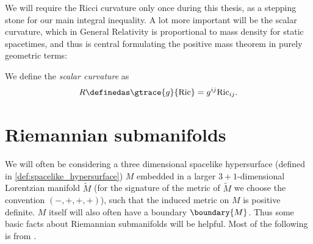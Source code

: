 \documentclass[titlepage,numbers=noenddot,headinclude,oneside,%
footinclude=true,cleardoublepage=empty,%
BCOR=5mm,paper=a4,fontsize=11pt,%
english,%
]{scrartcl}
\newcommand{\Ricci}{\mathrm{Ric}} %
\begin{document}
We will require the Ricci curvature only once during this thesis, as a stepping stone for our main integral inequality. A lot more important will be the scalar curvature, which in General Relativity is proportional to mass density for static spacetimes, and thus is central formulating the positive mass theorem in purely geometric terms:
\begin{definition}
    We define the \emph{scalar curvature} as
    \begin{equation*}
        R\definedas \gtrace{g}{\Ricci}=g^{ij}\Ricci_{ij}.
    \end{equation*}
\end{definition}

\section{Riemannian submanifolds}\label{sec:riemannian_submanifolds}

We will often be considering a three dimensional spacelike hypersurface (defined in \cref{def:spacelike_hypersurface})  \( M \) embedded in a larger \( 3+1 \)-dimensional Lorentzian manifold \( \tilde{M} \) (for the signature of the metric of \( \tilde{M} \) we choose the convention \( (-,+,+,+) \)), such that the induced metric on \( M \) is positive definite. \( M \) itself will also often have a boundary \( \boundary{M} \). Thus some basic facts about Riemannian submanifolds will be helpful. Most of the following is from \cite[Chapter~2.1]{leeGeometricRelativity2019}.
\end{document}

